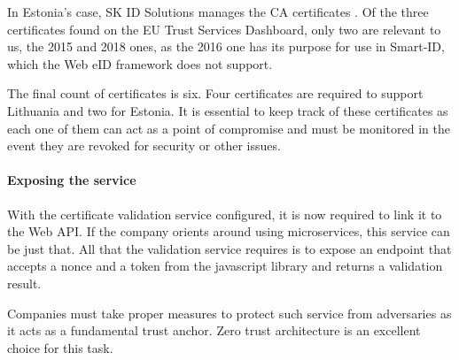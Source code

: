In Estonia's case, SK ID Solutions manages the CA certificates \cite{eid-ee-skid-certificates}. Of the three certificates found on the EU Trust Services Dashboard, only two are relevant to us, the 2015 and 2018 ones, as the 2016 one has its purpose for use in Smart-ID, which the Web eID framework does not support.

The final count of certificates is six. Four certificates are required to support Lithuania and two for Estonia. It is essential to keep track of these certificates as each one of them can act as a point of compromise and must be monitored in the event they are revoked for security \cite{roca-vulnerability-lessons-learned} or other issues.

\paragraph{Exposing the service}

With the certificate validation service configured, it is now required to link it to the Web API. If the company orients around using microservices, this service can be just that. All that the validation service requires is to expose an endpoint that accepts a nonce and a token from the javascript library and returns a validation result.

Companies must take proper measures to protect such service from adversaries as it acts as a fundamental trust anchor. {Zero trust architecture} \cite{zero-trust-architecture} is an excellent choice for this task.
